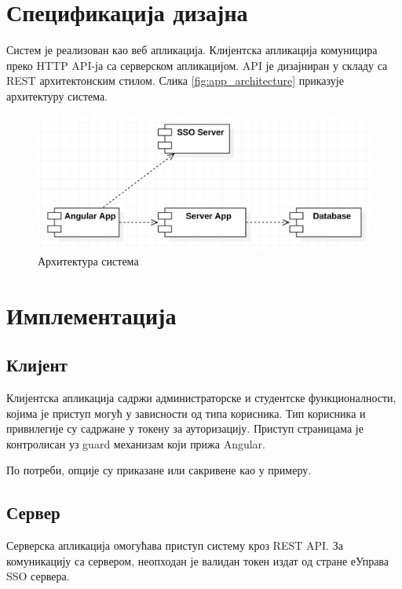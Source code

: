 \documentclass[a4paper]{article}
\begin{document}
\section*{Спецификација дизајна}

Систем је реализован као веб апликација. Клијентска апликација комуницира преко HTTP API-ја са серверском апликацијом. API је
дизајниран у складу са REST архитектонским стилом\cite{rest}. Слика \autoref{fig:app_architecture} приказује архитектуру система.

\begin{figure}[H]
    \centering
    \includegraphics{images/app_architecture.png}
    \caption{Архитектура система}
    \label{fig:app_architecture}
\end{figure}

\section*{Имплементација}

\subsection*{Клијент}

Клијентска апликација садржи администраторске и студентске функционалности, којима је приступ могућ у зависности од
типа корисника. Тип корисника и привилегије су садржане у токену за ауторизацију. Приступ страницама је контролисан уз guard механизам који прижа Angular.

По потреби, опције су приказане или сакривене као у примеру.

\subsection*{Сервер}

Серверска апликација омогућава приступ систему кроз REST API\cite{rest}. За комуникацију са сервером, неопходан је валидан токен издат од стране еУправа SSO сервера.
\end{document}
